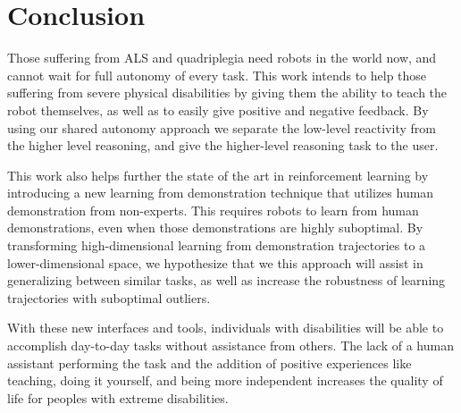 \documentclass{acm_proc_article-sp}
\begin{document}
\section{Conclusion}
Those suffering from ALS and quadriplegia need robots in the world now, and cannot wait for full autonomy of every task. This work intends to help those suffering from severe physical disabilities by giving them the ability to teach the robot themselves, as well as to easily give positive and negative feedback. By using our shared autonomy approach we separate the low-level reactivity from the higher level reasoning, and give the higher-level reasoning task to the user. 

This work also helps further the state of the art in reinforcement learning by introducing a new learning from demonstration technique that utilizes human demonstration from non-experts. This requires robots to learn from human demonstrations, even when those demonstrations are highly suboptimal. By transforming high-dimensional learning from demonstration trajectories to a lower-dimensional space, we hypothesize that we this approach will assist in generalizing between similar tasks, as well as increase the robustness of learning trajectories with suboptimal outliers.


With these new interfaces and tools, individuals with disabilities will be able to accomplish day-to-day tasks without assistance from others. The lack of a human assistant performing the task and the addition of positive experiences like teaching, doing it yourself, and being more independent increases the quality of life for peoples with extreme disabilities.








\end{document}
